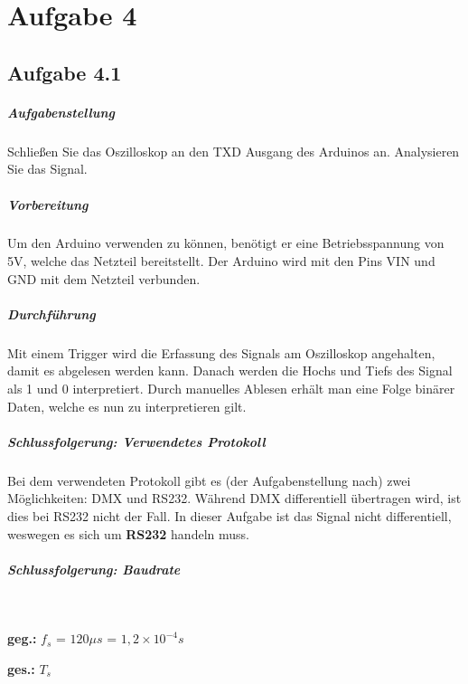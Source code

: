 \chapter{Aufgabe 4}
\section{Aufgabe 4.1}
\paragraph{Aufgabenstellung}
Schließen Sie das Oszilloskop an den TXD Ausgang des Arduinos an. Analysieren Sie das Signal.

\paragraph{Vorbereitung}
Um den Arduino verwenden zu können, benötigt er eine Betriebsspannung von 5V, welche das Netzteil bereitstellt. Der Arduino wird mit den Pins VIN und GND mit dem Netzteil verbunden.

\paragraph{Durchführung}
Mit einem Trigger wird die Erfassung des Signals am Oszilloskop angehalten, damit es abgelesen werden kann. Danach werden die Hochs und Tiefs des Signal als 1 und 0 interpretiert. Durch manuelles Ablesen erhält man eine Folge binärer Daten, welche es nun zu interpretieren gilt.

\paragraph{Schlussfolgerung: Verwendetes Protokoll}
Bei dem verwendeten Protokoll gibt es (der Aufgabenstellung nach) zwei Möglichkeiten: DMX und RS232. Während DMX differentiell übertragen wird, ist dies bei RS232 nicht der Fall. In dieser Aufgabe ist das Signal nicht differentiell, weswegen es sich um \textbf{RS232} handeln muss.

\paragraph{Schlussfolgerung: Baudrate}

\mbox{}\\
\noindent
\begin{minipage}{0.5\textwidth}
	\textbf{geg.:} $f_s$ = $120 \mu s$ = $1,2 \times 10^{-4} s$
\end{minipage}%
\begin{minipage}{0.5\textwidth}
	\textbf{ges.:} $T_s$
\end{minipage}

